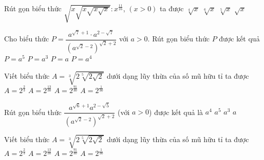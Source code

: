\begin{ex}%
	Rút gọn biểu thức $\sqrt{x\sqrt{x\sqrt{x\sqrt{x}}}}\colon x^{\tfrac{11}{16}}$, $(x>0)$ ta được
	\choice
	{\True $\sqrt[4]{x}$}
	{$\sqrt[6]{x}$}
	{$\sqrt[5]{x}$}
	{$\sqrt{x}$}
\end{ex}
\begin{ex}%
	Cho biểu thức $P=\dfrac{a^{\sqrt{7}+1}\cdot a^{2-\sqrt{7}}}{\left(a^{\sqrt{2}-2}\right)^{\sqrt{2}+2}}$ với $a>0$. Rút gọn biểu thức $P$ được kết quả
	\choice
	{\True $P=a^5$}
	{$P=a^3$}
	{$P=a$}
	{$P=a^4$}
\end{ex}
\begin{ex}%
	Viết biểu thức $A=\sqrt[3]{2\sqrt[5]{2\sqrt{2}}}$ dưới dạng lũy thừa của số mũ hữu tỉ ta được
	\choice
	{$A=2^{\tfrac{2}{3}}$}
	{\True $A=2^{\tfrac{13}{30}}$}
	{$A=2^{\tfrac{91}{30}}$}
	{$A=2^{\tfrac{1}{30}}$}
\end{ex}
\begin{ex}%
	Rút gọn biểu thức $\dfrac{a^{\sqrt{6}+1}a^{2-\sqrt{5}}}{\left(a^{\sqrt{2}-2}\right)^{\sqrt{2}+2}}$ (với $a>0$) được kết quả là
	\choice
	{$a^4$}
	{\True $a^5$}
	{$a^3$}
	{$a$}
\end{ex}
\begin{ex}%
	Viết biểu thức $A=\sqrt[3]{2\sqrt[5]{2\sqrt{2}}}$ dưới dạng lũy thừa của số mũ hữu tỉ ta được
	\choice
	{$A=2^{\tfrac{2}{3}}$}
	{\True $A=2^{\tfrac{13}{30}}$}
	{$A=2^{\tfrac{91}{30}}$}
	{$A=2^{\tfrac{1}{30}}$}
\end{ex}
